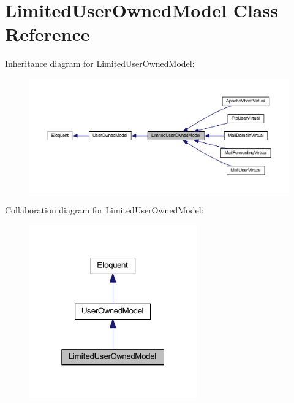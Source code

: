 \hypertarget{class_limited_user_owned_model}{}\section{Limited\+User\+Owned\+Model Class Reference}
\label{class_limited_user_owned_model}


Inheritance diagram for Limited\+User\+Owned\+Model\+:
\nopagebreak
\begin{figure}[H]
\begin{center}
\leavevmode
\includegraphics[width=350pt]{class_limited_user_owned_model__inherit__graph}
\end{center}
\end{figure}


Collaboration diagram for Limited\+User\+Owned\+Model\+:
\nopagebreak
\begin{figure}[H]
\begin{center}
\leavevmode
\includegraphics[width=205pt]{class_limited_user_owned_model__coll__graph}
\end{center}
\end{figure}
